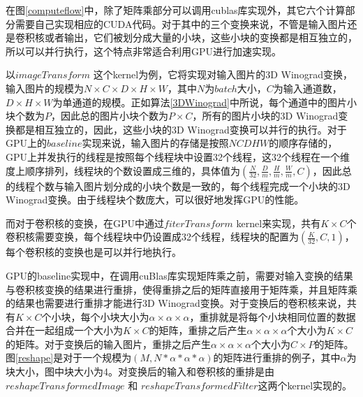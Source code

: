 在图\ref{computeflow}中，除了矩阵乘部分可以调用cublas库实现外，其它六个计算部分需要自己实现相应的CUDA代码。对于其中的三个变换来说，不管是输入图片还是卷积核或者输出，它们被划分成大量的小块，这些小块的变换都是相互独立的，所以可以并行执行，这个特点非常适合利用GPU进行加速实现。

以$imageTransform$ 这个kernel为例，它将实现对输入图片的3D Winograd变换，输入图片的规模为$N \times C \times D \times H \times W$，其中$N$为$batch$大小，$C$为输入通道数，$D \times H \times W$为单通道的规模。正如算法\ref{3DWinograd}中所说，每个通道中的图片小块个数为$P$，因此总的图片小块个数为$P \times C$，所有的图片小块的3D Winograd变换都是相互独立的，因此，这些小块的3D Winograd变换可以并行的执行。对于GPU上的$baseline$实现来说，输入图片的存储是按照$NCDHW$的顺序存储的，GPU上并发执行的线程是按照每个线程块中设置32个线程，这32个线程在一个维度上顺序排列，线程块的个数设置成三维的，具体值为$(\frac{N}{32},\frac{D}{m},\frac{H}{m},\frac{W}{m},C)$，因此总的线程个数与输入图片划分成的小块个数是一致的，每个线程完成一个小块的3D Winograd变换。由于线程块个数庞大，可以很好地发挥GPU的性能。

而对于卷积核的变换，在GPU中通过$fiterTransform$ kernel来实现，共有$K \times C$个卷积核需要变换，每个线程块中仍设置成32个线程，线程块的配置为$(\frac{K}{32},C,1)$，每个卷积核的变换也是可以并行地执行。

GPU的baseline实现中，在调用cuBlas库实现矩阵乘之前，需要对输入变换的结果与卷积核变换的结果进行重排，使得重排之后的矩阵直接用于矩阵乘，并且矩阵乘的结果也需要进行重排才能进行3D Winograd变换。对于变换后的卷积核来说，共有$K \times C$个小块，每个小块大小为$\alpha \times \alpha \times \alpha$，重排就是将每个小块相同位置的数据合并在一起组成一个大小为$K \times C$的矩阵，重排之后产生$\alpha \times \alpha \times \alpha$个大小为$K \times C$的矩阵。对于变换后的输入图片，重排之后产生$\alpha \times \alpha \times \alpha$个大小为$C \times P$的矩阵。图\ref{reshape}是对于一个规模为$(M,N*\alpha *\alpha *\alpha)$的矩阵进行重排的例子，其中$\alpha$为块大小，图中块大小为4。对变换后的输入和卷积核的重排是由$reshapeTransformedImage$ 和 $reshapeTransformedFilter$这两个kernel实现的。

